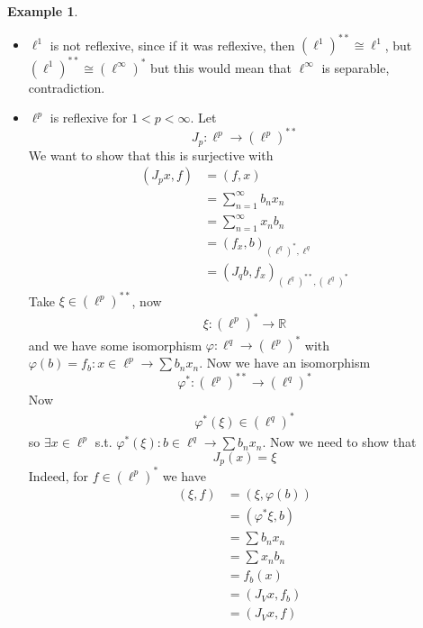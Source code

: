 \documentclass[11pt,a4paper]{article}
\theoremstyle{definition}
\newtheorem{example}[definition]{Example}
\theoremstyle{plain}
\theoremstyle{remark}
\newcommand{\R}{\mathbb{R}}
\newcommand{\1}{\mathbbm{1}}
\begin{document}
\begin{example}
    \begin{itemize}
        \item $\ell^1$ is not reflexive, since if it was reflexive, then $(\ell^1)^{**} \cong \ell^1$, but 
        $(\ell^1)^{**} \cong (\ell^\infty)^*$ but this would mean that $\ell^\infty$ is separable, contradiction. 

        \item $\ell^p$ is reflexive for $1 < p < \infty$. Let 
        $$J_p \colon \ell^p \to (\ell^p)^{**}$$
        We want to show that this is surjective with 
        \begin{align*}
            (J_p x, f) &= (f, x)\\
            &= \sum_{n=1}^\infty b_n x_n \\
            &= \sum_{n=1}^\infty x_n b_n \\
            &= (f_x, b)_{(\ell^q)^*, \ell^q} \\
            &= (J_q b, f_x)_{(\ell^q)^{**}, (\ell^q)^*} 
        \end{align*}
        Take $\xi \in (\ell^p)^{**}$, now 
        \begin{align*}
            \xi \colon (\ell^p)^* \to \R 
        \end{align*}
        and we have some isomorphism $\varphi \colon \ell^q \to (\ell^p)^*$ with $\varphi(b) = f_b \colon x \in \ell^p \to \sum b_n x_n$. 
        Now we have an isomorphism
        $$\varphi^* \colon (\ell^p)^{**} \to (\ell^q)^*$$
        Now 
        \begin{align*}
            \varphi^* (\xi) \in (\ell^q)^*
        \end{align*} 
        so $\exists x \in \ell^p$ s.t. $\varphi^*(\xi) \colon b \in \ell^q \to \sum b_n x_n$. Now we need to show that 
        $$J_p (x) = \xi$$
        Indeed, for $f \in (\ell^p)^*$ we have 
        \begin{align*}
            (\xi, f) &= (\xi, \varphi(b)) \\
            &= (\varphi^* \xi, b) \\
            &= \sum b_n x_n \\
            &= \sum x_n b_n \\
            &= f_b (x) \\
            &= (J_V x, f_b) \\
            &= (J_Vx , f)
        \end{align*}
    \end{itemize}
\end{example}
\end{document}
